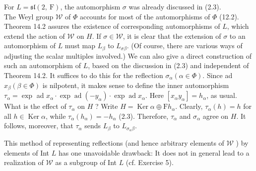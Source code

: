 \documentclass[10pt]{article}
\begin{document}
For $L=\mathfrak{s l}(2, \mathrm{~F})$, the automorphism $\sigma$ was already discussed in (2.3).\\
The Weyl group $\mathscr{W}$ of $\Phi$ accounts for most of the automorphisms of $\Phi$ (12.2). Theorem 14.2 assures the existence of corresponding automorphisms of $L$, which extend the action of $\mathscr{W}$ on $H$. If $\sigma \in \mathscr{W}$, it is clear that the extension of $\sigma$ to an automorphism of $L$ must map $L_{\beta}$ to $L_{\sigma \beta}$. (Of course, there are various ways of adjusting the scalar multiples involved.) We can also give a direct construction of such an automorphism of $L$, based on the discussion in (2.3) and independent of Theorem 14.2. It suffices to do this for the reflection $\sigma_{\alpha}(\alpha \in \Phi)$. Since ad $x_{\beta}(\beta \in \Phi)$ is nilpotent, it makes sense to define the inner automorphism $\tau_{\alpha}=\exp$ ad $x_{\alpha} \cdot \exp \operatorname{ad}\left(-y_{\alpha}\right) \cdot \exp \operatorname{ad} x_{\alpha}$. Here $\left[x_{\alpha} y_{\alpha}\right]=h_{\alpha}$, as usual. What is the effect of $\tau_{\alpha}$ on $H$ ? Write $H=\operatorname{Ker} \alpha \oplus \mathrm{F} h_{\alpha}$. Clearly, $\tau_{\alpha}(h)=h$ for all $h \in \operatorname{Ker} \alpha$, while $\tau_{\alpha}\left(h_{\alpha}\right)=-h_{\alpha}$ (2.3). Therefore, $\tau_{\alpha}$ and $\sigma_{\alpha}$ agree on $H$. It follows, moreover, that $\tau_{\alpha}$ sends $L_{\beta}$ to $L_{\sigma_{\alpha} \beta}$.

This method of representing reflections (and hence arbitrary elements of $\mathscr{W}$ ) by elements of Int $L$ has one unavoidable drawback: It does not in general lead to a realization of $\mathscr{W}$ as a subgroup of Int $L$ (cf. Exercise 5).
\end{document}
